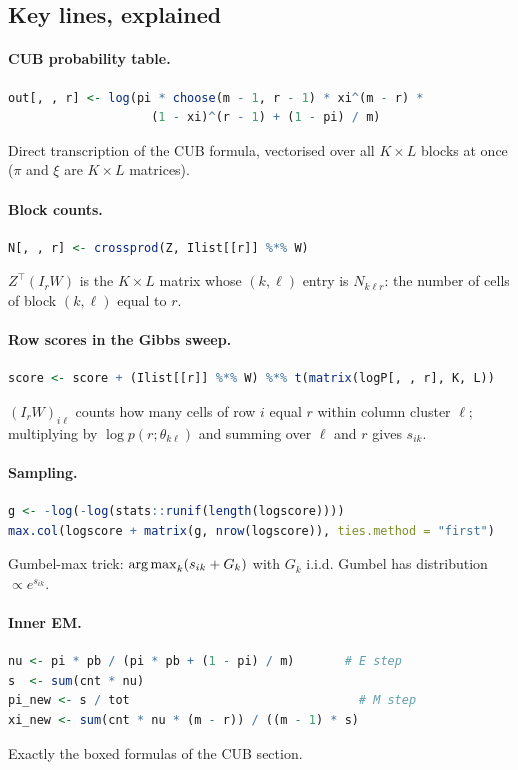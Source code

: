 \subsection{Key lines, explained}

\paragraph{CUB probability table.}
\begin{lstlisting}[language=R]
out[, , r] <- log(pi * choose(m - 1, r - 1) * xi^(m - r) *
                    (1 - xi)^(r - 1) + (1 - pi) / m)
\end{lstlisting}
Direct transcription of the CUB formula, vectorised over all $K\times L$
blocks at once ($\pi$ and $\xi$ are $K\times L$ matrices).

\paragraph{Block counts.}
\begin{lstlisting}[language=R]
N[, , r] <- crossprod(Z, Ilist[[r]] %*% W)
\end{lstlisting}
$Z^\top(I_rW)$ is the $K\times L$ matrix whose $(k,\ell)$ entry is
$N_{k\ell r}$: the number of cells of block $(k,\ell)$ equal to $r$.

\paragraph{Row scores in the Gibbs sweep.}
\begin{lstlisting}[language=R]
score <- score + (Ilist[[r]] %*% W) %*% t(matrix(logP[, , r], K, L))
\end{lstlisting}
$(I_rW)_{i\ell}$ counts how many cells of row $i$ equal $r$ within column
cluster $\ell$; multiplying by $\log p(r;\theta_{k\ell})$ and summing over
$\ell$ and $r$ gives $s_{ik}$.

\paragraph{Sampling.}
\begin{lstlisting}[language=R]
g <- -log(-log(stats::runif(length(logscore))))
max.col(logscore + matrix(g, nrow(logscore)), ties.method = "first")
\end{lstlisting}
Gumbel-max trick: $\operatorname*{arg\,max}_k(s_{ik}+G_k)$ with $G_k$ i.i.d. Gumbel has
distribution $\propto e^{s_{ik}}$.

\paragraph{Inner EM.}
\begin{lstlisting}[language=R]
nu <- pi * pb / (pi * pb + (1 - pi) / m)       # E step
s  <- sum(cnt * nu)
pi_new <- s / tot                                # M step
xi_new <- sum(cnt * nu * (m - r)) / ((m - 1) * s)
\end{lstlisting}
Exactly the boxed formulas of the CUB section.

